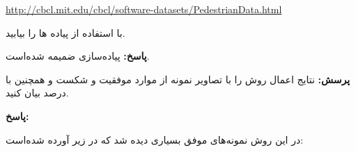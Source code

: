 \documentclass[12pt,a4paper]{article}
\theoremstyle{definition}
\theoremstyle{theorem}
\theoremstyle{definition}
\begin{document}
\url{http://cbcl.mit.edu/cbcl/software-datasets/PedestrianData.html}

 با استفاده از  پیاده ها را بیابید.

\textbf{پاسخ: } 
پیاده‌سازی ضمیمه شده‌است.
\vspace{0.5cm}

\textbf{پرسش: }
نتایج اعمال روش را با تصاویر نمونه از موارد موفقیت و شکست و همچنین با درصد بیان کنید.

\textbf{پاسخ: } 

در این روش نمونه‌های موفق بسیاری دیده شد که در زیر آورده شده‌است: 
\begin{center}
\vspace{-0.1cm}
\end{center}
\end{document}
